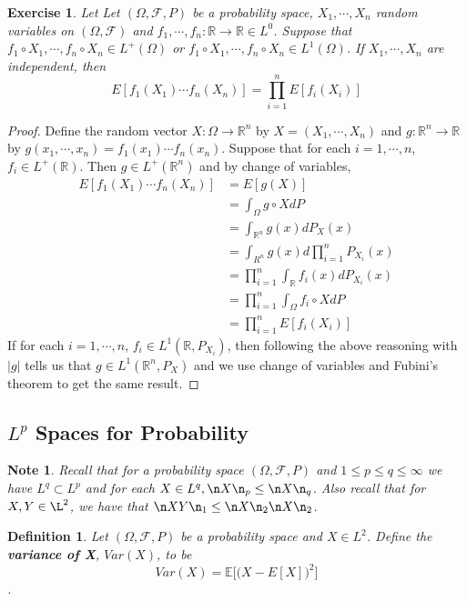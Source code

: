 \documentclass[12pt]{amsart}
\newtheorem{defn}[thm]{Definition}
\newtheorem{note}[thm]{Note}
\newtheorem{ex}[thm]{Exercise}
\newcommand{\Om}{\Omega}
\newcommand{\E}{\mathbb{E}}
\newcommand{\R}{\mathbb{R}}
\newcommand{\MF}{\mathcal{F}}
\begin{document}
\begin{ex}
	Let Let $(\Om, \MF, P)$ be a probability space, $X_1, \cdots, X_n$ random variables on $(\Om, \MF)$ and $f_1, \cdots, f_n: \R \rightarrow \R \in L^0$. Suppose that $f_1 \circ X_1, \cdots, f_n \circ X_n\in L^+(\Om)$ or $f_1 \circ X_1, \cdots, f_n \circ X_n \in L^1(\Om)$. If $X_1, \cdots, X_n$ are independent, then $$E[f_1(X_1) \cdots f_n(X_n)] = \prod_{i=1}^n E[f_i(X_i)]$$
\end{ex}

\begin{proof}
	Define the random vector $X : \Om \rightarrow \R^n$ by $X = (X_1, \cdots, X_n)$ and $g:\R^n \rightarrow \R$ by $g(x_1, \cdots, x_n) = f_1(x_1) \cdots f_n(x_n)$. Suppose that for each $i = 1, \cdots, n$, $f_i \in L^+(\R)$. Then $g \in L^+(\R^n)$ and by change of variables,  
	\begin{align*}
		E[f_1(X_1) \cdots f_n(X_n)] 
		&= E[g(X)] \\
		&= \int_{\Om} g \circ X dP \\
		&= \int_{\R^n} g(x) dP_X(x) \\
		&= \int_{R^n} g(x) d \prod\limits_{i=1}^nP_{X_i}(x) \\
		&=  \prod_{i=1}^n \int_{\R}f_i(x) d P_{X_i}(x) \\ 
		&= \prod_{i=1}^n \int_{\Om}f_i \circ X d P \\
		&= \prod_{i=1}^n E[f_i(X_i)]
	\end{align*}
	If for each $i = 1, \cdots, n$, $f_i \in L^1(\R, P_{X_i})$, then following the above reasoning with $\vert g \vert $ tells us that $g \in L^1(\R^n, P_X)$ and we use change of variables and Fubini's theorem to get the same result.  
\end{proof}

\subsection{$L^p$ Spaces for Probability}

\begin{note}
	Recall that for a probability space $(\Om, \MF, P)$ and $1 \leq p \leq q \leq \infty$ we have $L^q \subset L^p$ and for each $X \in L^q, \n X \n_p \leq  \n X\n_q$. Also recall that for $X,Y \in \L^2$, we have that $\n XY \n_1 \leq \n X\n_2 \n X\n_2$.
\end{note}

\begin{defn}
	Let $(\Om, \MF, P)$ be a probability space and $X \in L^2$. Define the \textbf{variance of X}, $Var(X)$, to be $$Var(X) = \E\big[\big(X-E[X]\big)^2\big]$$.
\end{defn}
\end{document}
